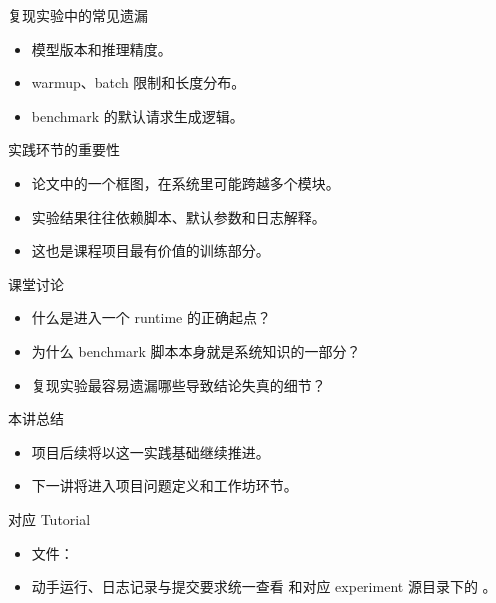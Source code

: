 \begin{frame}{复现实验中的常见遗漏}
  \begin{itemize}
    \item 模型版本和推理精度。
    \item warmup、batch 限制和长度分布。
    \item benchmark 的默认请求生成逻辑。
  \end{itemize}
\end{frame}

\begin{frame}{实践环节的重要性}
  \begin{itemize}
    \item 论文中的一个框图，在系统里可能跨越多个模块。
    \item 实验结果往往依赖脚本、默认参数和日志解释。
    \item 这也是课程项目最有价值的训练部分。
  \end{itemize}
\end{frame}



\begin{frame}{课堂讨论}
  \begin{itemize}
    \item 什么是进入一个 runtime 的正确起点？
    \item 为什么 benchmark 脚本本身就是系统知识的一部分？
    \item 复现实验最容易遗漏哪些导致结论失真的细节？
  \end{itemize}
\end{frame}

\begin{frame}{本讲总结}
  \begin{itemize}
    \item 项目后续将以这一实践基础继续推进。
    \item 下一讲将进入项目问题定义和工作坊环节。
  \end{itemize}
\end{frame}

\LectureTwelveSources

\begin{frame}{对应 Tutorial}
  \begin{itemize}
    \item 文件：\texttt{}
    \item 动手运行、日志记录与提交要求统一查看 \texttt{} 和对应 experiment 源目录下的 \texttt{}。
  \end{itemize}
\end{frame}


